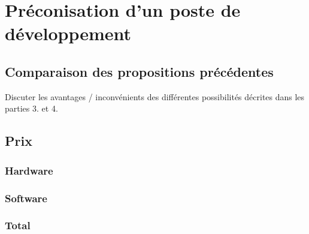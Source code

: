 \chapter{Préconisation d'un poste de développement}

\section{Comparaison des propositions précédentes}

Discuter les avantages / inconvénients des différentes possibilités décrites dans les parties 3. et 4.


\section{Prix}



\subsection{Hardware}

\subsection{Software}

\subsection{Total}